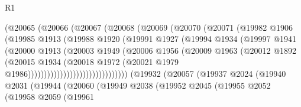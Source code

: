 \begin{lexlean}{R1}
\begin{coremodule}
                            (@20065
                              (@20066
                                (@20067
                                  (@20068
                                    (@20069
                                      (@20070
                                        (@20071
                                          (@19982
                                            @1906
                                            (@19985
                                              @1913
                                              (@19988
                                                @1920
                                                (@19991
                                                  @1927
                                                  (@19994
                                                    @1934
                                                    (@19997
                                                      @1941
                                                      (@20000
                                                        @1913
                                                        (@20003
                                                          @1949
                                                          (@20006
                                                            @1956
                                                            (@20009
                                                              @1963
                                                              (@20012
                                                                @1892
                                                                (@20015
                                                                  @1934
                                                                  (@20018
                                                                    @1972
                                                                    (@20021
                                                                      @1979
                                                                      @1986)))))))))))))))))))))))))))))))
        (@19932
          (@20057
            (@19937
              @2024
              (@19940
                @2031
                (@19944
                  (@20060
                    (@19949
                      @2038
                      (@19952
                        @2045
                        (@19955
                          @2052
                          (@19958
                            @2059
                            (@19961

\end{coremodule}
\end{lexlean}
